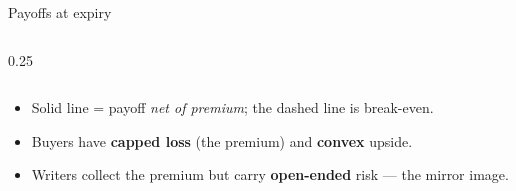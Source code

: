 \documentclass[11pt,aspectratio=169]{beamer}
\begin{document}
\begin{frame}{Payoffs at expiry}
\begin{columns}[T]
\begin{column}{0.25\textwidth}
      \\[-0.2em]
    \end{column}
  \end{columns}
  \vspace{0.2em}
  \begin{itemize}\small
    \item Solid line = payoff \emph{net of premium}; the dashed line is break-even.
    \item Buyers have \textbf{capped loss} (the premium) and \textbf{convex} upside.
    \item Writers collect the premium but carry \textbf{open-ended} risk — the mirror image.
  \end{itemize}
\end{frame}
\end{document}
